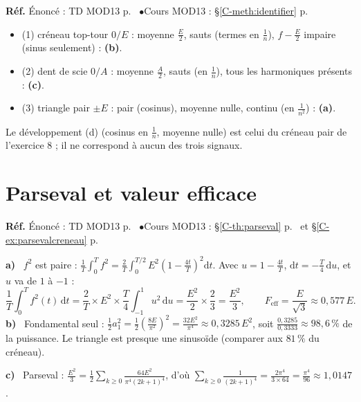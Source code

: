 \documentclass[a4paper,11pt]{article}
\newcommand{\cours}[1]{§\ref{C-#1} p.~\pageref{C-#1}}
\newcommand{\source}[2]{{\footnotesize\color{uimmgray}\textbf{Réf.} \enspace Énoncé : TD MOD13 p.~\pageref{T-#1} \enspace$\bullet$\enspace Cours MOD13 : #2}\par\smallskip}
\newcommand{\q}[1]{\textbf{\color{uimmblue}#1}\ }
\begin{document}
\begin{correction}
\source{exo:12}{\cours{meth:identifier}}
\begin{itemize}
  \item (1) créneau top-tour $0/E$ : moyenne $\frac E2$, sauts (termes en $\frac1n$), $f - \frac E2$ impaire (sinus seulement) : \textbf{(b)}.
  \item (2) dent de scie $0/A$ : moyenne $\frac A2$, sauts (en $\frac1n$), tous les harmoniques présents : \textbf{(c)}.
  \item (3) triangle pair $\pm E$ : pair (cosinus), moyenne nulle, continu (en $\frac1{n^2}$) : \textbf{(a)}.
\end{itemize}
Le développement (d) (cosinus en $\frac1n$, moyenne nulle) est celui du créneau pair de l'exercice 8 ; il ne correspond à aucun des trois signaux.
\end{correction}

\needspace{8cm}
\section{Parseval et valeur efficace}

\begin{correction}
\source{exo:13}{\cours{th:parseval} et \cours{ex:parsevalcreneau}}
\q{a)} $f^2$ est paire : $\frac1T\int_0^T f^2 = \frac2T\int_0^{T/2}E^2\left(1-\frac{4t}T\right)^2\mathrm dt$. Avec $u = 1 - \frac{4t}{T}$, $\mathrm dt = -\frac T4\,\mathrm du$, et $u$ va de $1$ à $-1$ :
\[
\frac1T\int_0^T f^2(t)\,\mathrm dt = \frac2T\times E^2\times\frac T4\int_{-1}^{1}u^2\,\mathrm du = \frac{E^2}{2}\times\frac23 = \frac{E^2}{3},
\qquad
F_{\text{eff}} = \frac{E}{\sqrt3}\approx 0{,}577\,E.
\]
\q{b)} Fondamental seul : $\frac12a_1^2 = \frac12\left(\frac{8E}{\pi^2}\right)^2 = \frac{32E^2}{\pi^4}\approx 0{,}3285\,E^2$, soit $\frac{0{,}3285}{0{,}3333}\approx 98{,}6\,\%$ de la puissance. Le triangle est presque une sinusoïde (comparer aux $81\,\%$ du créneau).

\q{c)} Parseval : $\frac{E^2}{3} = \frac12\sum_{k\geq0}\frac{64E^2}{\pi^4(2k+1)^4}$, d'où $\displaystyle\sum_{k\geq0}\frac{1}{(2k+1)^4} = \frac{2\pi^4}{3\times 64} = \frac{\pi^4}{96}\approx 1{,}0147$.
\end{correction}
\end{document}
